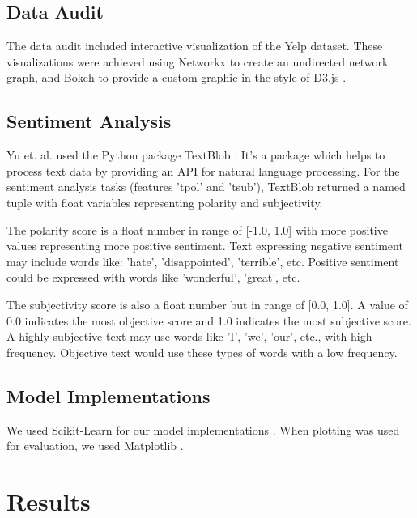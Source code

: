 \documentclass[12pt]{article}
\begin{document}
\subsection{Data Audit}

The data audit included interactive visualization of the Yelp dataset. These visualizations
were achieved using Networkx \cite{NetworkX32:online} to create an undirected network graph,
and Bokeh \cite{Welcomet73:online}  to provide a custom graphic in the style of D3.js
\cite{D3jsData97:online}. 

\subsection{Sentiment Analysis}

Yu et. al. \cite{yu2015restaurants} used the Python package TextBlob \cite{TextBlob35:online}.
It's a package which helps to process text data by providing an API for natural language
processing. For the sentiment analysis tasks (features 'tpol' and 'tsub'), TextBlob returned
a named tuple with float variables representing polarity and subjectivity.

The polarity score is a float number in range of [-1.0, 1.0] with more positive values
representing more positive sentiment. Text expressing negative sentiment may include words
like: 'hate', 'disappointed', 'terrible', etc. Positive sentiment could be expressed with
words like 'wonderful', 'great', etc.

The subjectivity score is also a float number but in range of [0.0, 1.0]. A value of 0.0
indicates the most objective score and 1.0 indicates the most subjective score. A highly
subjective text may use words like 'I', 'we', 'our', etc., with high frequency. Objective
text would use these types of words with a low frequency.

\subsection{Model Implementations}

We used Scikit-Learn for our model implementations \cite{sklearnl76:online, 32432skl20:online,
  sklearnt25:online}. When plotting was used for evaluation, we used
Matplotlib \cite{Matplotl1:online}. 

\section{Results}
\end{document}
